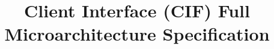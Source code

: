 \documentclass[11pt]{article}
\begin{document}
\title{\textbf{Client Interface (CIF) Full Microarchitecture Specification}}
\author{}
\date{}

\maketitle
\tableofcontents
\newpage




\appendix







\end{document}
